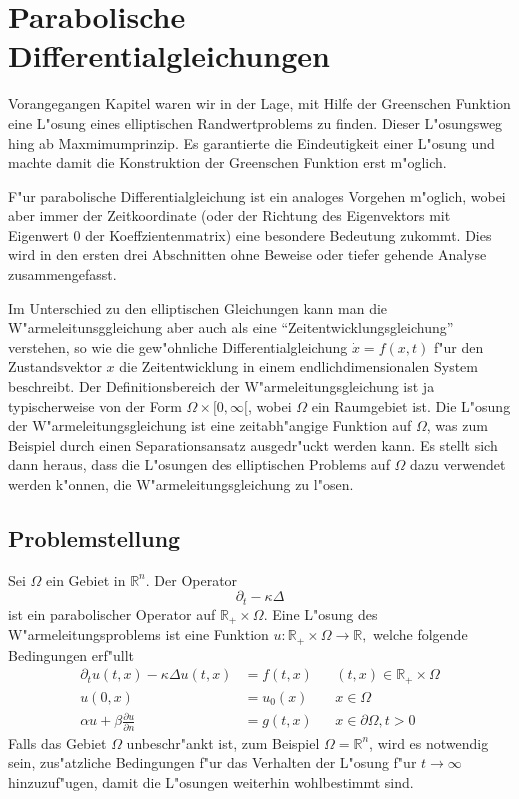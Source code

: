 %
%
%
\chapter{Parabolische Differentialgleichungen\label{chapter-parabolisch}}
\rhead{}
Vorangegangen Kapitel waren wir in der Lage, mit Hilfe der Greenschen
Funktion eine L"osung eines elliptischen Randwertproblems zu finden.
Dieser L"osungsweg hing ab Maxmimumprinzip.
Es garantierte die Eindeutigkeit einer
L"osung und machte damit die Konstruktion der Greenschen Funktion
erst m"oglich.

F"ur parabolische Differentialgleichung ist ein analoges Vorgehen
m"oglich, wobei aber immer der Zeitkoordinate (oder der Richtung
des Eigenvektors mit Eigenwert $0$ der Koeffzientenmatrix)
eine besondere Bedeutung zukommt.
Dies wird in den ersten drei
Abschnitten ohne Beweise  oder tiefer gehende Analyse zusammengefasst.

Im Unterschied zu den elliptischen
Gleichungen kann man die W"armeleitunsggleichung aber auch
als eine ``Zeitentwicklungsgleichung'' verstehen, so wie die
gew"ohnliche Differentialgleichung $\dot x=f(x,t)$
f"ur den Zustandsvektor $x$ die Zeitentwicklung in einem endlichdimensionalen
System beschreibt. Der Definitionsbereich der W"armeleitungsgleichung
ist ja typischerweise von der Form $\Omega\times[0,\infty[$, wobei
$\Omega$ ein Raumgebiet ist.
Die L"osung der W"armeleitungsgleichung ist eine zeitabh"angige Funktion
auf $\Omega$, was zum Beispiel durch einen Separationsansatz
ausgedr"uckt werden kann. Es stellt sich dann heraus, dass die L"osungen
des elliptischen Problems auf $\Omega$ dazu verwendet werden k"onnen,
die W"armeleitungsgleichung zu l"osen.

\section{Problemstellung}
Sei $\Omega$ ein Gebiet in $\mathbb R^n$. Der Operator 
$$\partial_t-\kappa\Delta$$
ist ein parabolischer Operator auf $\mathbb R_+\times \Omega$.
Eine L"osung des W"armeleitungsproblems ist eine Funktion
$u\colon\mathbb R_+\times\Omega\to\mathbb R,$
welche folgende Bedingungen erf"ullt
\begin{align*}
\partial_tu(t,x)-\kappa\Delta u(t,x)&=f(t,x)&&(t,x)\in\mathbb R_+\times\Omega
\\
u(0,x)&=u_0(x)&&x\in\Omega
\\
\alpha u+\beta\frac{\partial u}{\partial n}&=g(t, x)&&x\in\partial\Omega, t>0
\end{align*}
Falls das Gebiet $\Omega$ unbeschr"ankt ist, zum Beispiel $\Omega=\mathbb R^n$,
wird es notwendig sein, zus"atzliche Bedingungen f"ur das Verhalten
der L"osung f"ur $t\to\infty$ hinzuzuf"ugen, damit die L"osungen weiterhin
wohlbestimmt sind.

